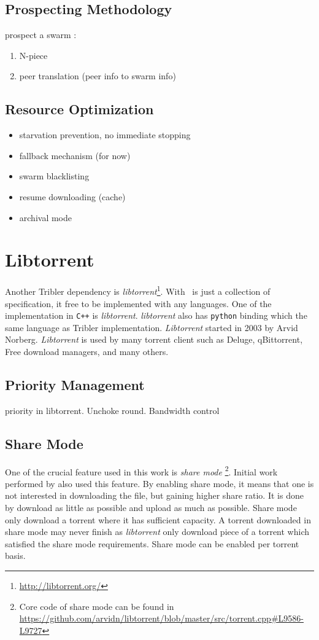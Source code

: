 \subsection{Prospecting Methodology}
prospect a swarm : 
\begin{enumerate}
	\item N-piece
	\item peer translation (peer info to swarm info)
\end{enumerate}

\subsection{Resource Optimization}
\begin{itemize}
	\item starvation prevention, no immediate stopping
	 \item fallback mechanism (for now)
\item 	 swarm blacklisting
\item 	 resume downloading (cache)
\item 	 archival mode
\end{itemize}


\section{Libtorrent}
Another Tribler dependency is \textit{libtorrent}\footnote{\url{http://libtorrent.org/}}. With \bt~is just a collection of specification, it free to be implemented with any languages. One of the implementation in \texttt{C++} is \textit{libtorrent}. \textit{libtorrent} also has \texttt{python} binding which the same language as Tribler implementation. \textit{Libtorrent} started in 2003 by Arvid Norberg. \textit{Libtorrent} is used by many torrent client such as Deluge, qBittorrent, Free download managers, and many others.

\subsection{Priority Management}
priority in libtorrent. Unchoke round. Bandwidth control

\subsection{Share Mode}
One of the crucial feature used in this work is \textit{share mode} \footnote{Core code of share mode can be found in \url{https://github.com/arvidn/libtorrent/blob/master/src/torrent.cpp\#L9586-L9727}}. Initial work performed by \citeauthor{2015:creditmining:capota} also used this feature\cite{2015:creditmining:capota}. By enabling share mode, it means that one is not interested in downloading the file, but gaining higher share ratio. It is done by download as little as possible and upload as much as possible. Share mode only download a torrent where it has sufficient capacity. A torrent downloaded in share mode may never finish as \textit{libtorrent} only download piece of a torrent which satisfied the share mode requirements. Share mode can be enabled per torrent basis.

